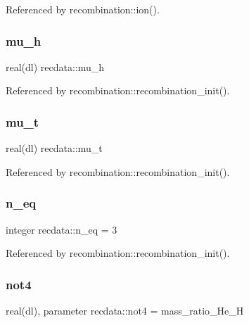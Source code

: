 Referenced by recombination\+::ion().

\mbox{\label{namespacerecdata_af00c668a1086ccf9c6fb815e45e5c9dd}} 
\subsubsection{\texorpdfstring{mu\+\_\+h}{mu\_h}}
{\footnotesize\ttfamily real(dl) recdata\+::mu\+\_\+h}



Referenced by recombination\+::recombination\+\_\+init().

\mbox{\label{namespacerecdata_afca9c6c4a945b5d2b59ca00f446f869a}} 
\subsubsection{\texorpdfstring{mu\+\_\+t}{mu\_t}}
{\footnotesize\ttfamily real(dl) recdata\+::mu\+\_\+t}



Referenced by recombination\+::recombination\+\_\+init().

\mbox{\label{namespacerecdata_a8ab5b420c3994ec0bbf10dd045a1c61d}} 
\subsubsection{\texorpdfstring{n\+\_\+eq}{n\_eq}}
{\footnotesize\ttfamily integer recdata\+::n\+\_\+eq = 3}



Referenced by recombination\+::recombination\+\_\+init().

\mbox{\label{namespacerecdata_affbfe58acc402b3952d720558fbd9344}} 
\subsubsection{\texorpdfstring{not4}{not4}}
{\footnotesize\ttfamily real(dl), parameter recdata\+::not4 = mass\+\_\+ratio\+\_\+\+He\+\_\+H}



